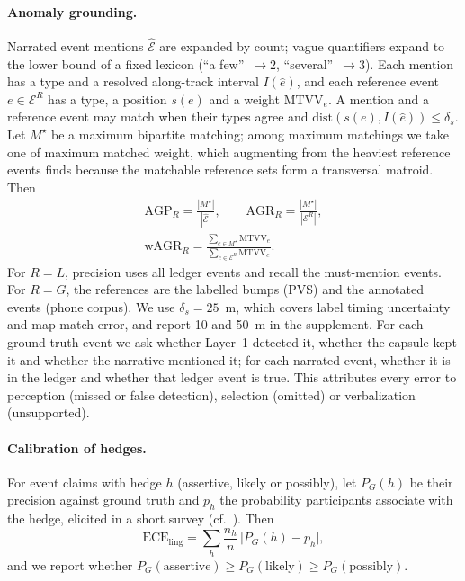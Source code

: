 \paragraph{Anomaly grounding.}
Narrated event mentions $\hat{\mathcal E}$ are expanded by count; vague quantifiers expand to the lower bound of a fixed lexicon (``a few''~$\to2$, ``several''~$\to3$).
Each mention has a type and a resolved along-track interval $I(\hat e)$, and each reference event $e\in\mathcal E^R$ has a type, a position $s(e)$ and a weight $\mathrm{MTVV}_e$.
A mention and a reference event may match when their types agree and $\mathrm{dist}(s(e),I(\hat e))\le\delta_s$.
Let $M^\star$ be a maximum bipartite matching; among maximum matchings we take one of maximum matched weight, which augmenting from the heaviest reference events finds because the matchable reference sets form a transversal matroid. Then
\begin{gather}
\mathrm{AGP}_R=\frac{|M^\star|}{|\hat{\mathcal E}|},\qquad
\mathrm{AGR}_R=\frac{|M^\star|}{|\mathcal E^R|},\\
\mathrm{wAGR}_R=\frac{\sum_{e\in M^\star}\mathrm{MTVV}_e}{\sum_{e\in\mathcal E^R}\mathrm{MTVV}_e}.
\end{gather}
For $R=L$, precision uses all ledger events and recall the must-mention events.
For $R=G$, the references are the labelled bumps (PVS) and the annotated events (phone corpus).
We use $\delta_s=25$~m, which covers label timing uncertainty and map-match error, and report 10 and 50~m in the supplement.
For each ground-truth event we ask whether Layer~1 detected it, whether the capsule kept it and whether the narrative mentioned it; for each narrated event, whether it is in the ledger and whether that ledger event is true.
This attributes every error to perception (missed or false detection), selection (omitted) or verbalization (unsupported).

\paragraph{Calibration of hedges.}
For event claims with hedge $h$ (assertive, likely or possibly), let $P_G(h)$ be their precision against ground truth and $p_h$ the probability participants associate with the hedge, elicited in a short survey (cf.~\cite{kent1964wep,mielke2022linguistic}). Then
\begin{equation}
\mathrm{ECE}_{\mathrm{ling}}=\sum_h\frac{n_h}{n}\,\bigl|P_G(h)-p_h\bigr| ,
\end{equation}
and we report whether $P_G(\text{assertive})\ge P_G(\text{likely})\ge P_G(\text{possibly})$.

